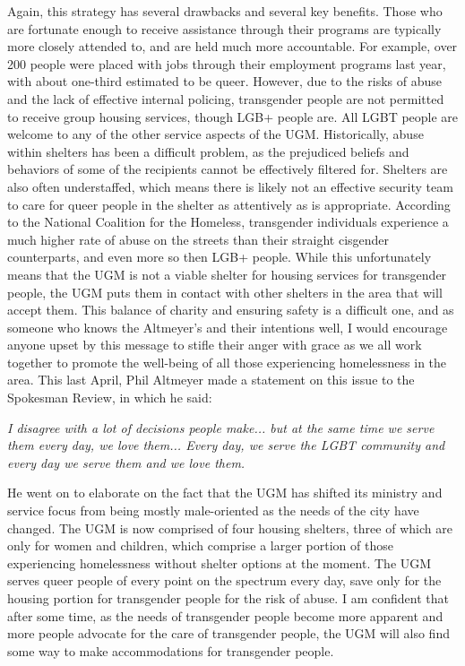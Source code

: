         \par Again, this strategy has several drawbacks and several key benefits.
        Those who are fortunate enough to receive assistance through their programs are typically more closely attended to, and are held much more accountable.
        For example, over 200 people were placed with jobs through their employment programs last year, with about one-third estimated to be queer.
        However, due to the risks of abuse and the lack of effective internal policing, transgender people are not permitted to receive group housing services, though LGB+ people are.
        All LGBT people are welcome to any of the other service aspects of the UGM.
        Historically, abuse within shelters has been a difficult problem, as the prejudiced beliefs and behaviors of some of the recipients cannot be effectively filtered for.
        Shelters are also often understaffed, which means there is likely not an effective security team to care for queer people in the shelter as attentively as is appropriate.
        According to the National Coalition for the Homeless, transgender individuals experience a much higher rate of abuse on the streets than their straight cisgender counterparts, and even more so then LGB+ people\cite{nch}.
        While this unfortunately means that the UGM is not a viable shelter for housing services for transgender people, the UGM puts them in contact with other shelters in the area that will accept them.
        This balance of charity and ensuring safety is a difficult one, and as someone who knows the Altmeyer's and their intentions well, I would encourage anyone upset by this message to stifle their anger with grace as we all work together to promote the well-being of all those experiencing homelessness in the area.
        This last April, Phil Altmeyer made a statement on this issue to the Spokesman Review, in which he said:
        \par \textit{
            I disagree with a lot of decisions people make... but at the same time we serve them every day, we love them...
            Every day, we serve the LGBT community and every day we serve them and we love them.
        }\cite{alt_vid}
        \par He went on to elaborate on the fact that the UGM has shifted its ministry and service focus from being mostly male-oriented as the needs of the city have changed.
        The UGM is now comprised of four housing shelters, three of which are only for women and children, which comprise a larger portion of those experiencing homelessness without shelter options at the moment.
        The UGM serves queer people of every point on the spectrum every day, save only for the housing portion for transgender people for the risk of abuse.
        I am confident that after some time, as the needs of transgender people become more apparent and more people advocate for the care of transgender people, the UGM will also find some way to make accommodations for transgender people.

